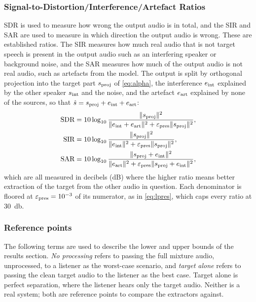 \subsubsection{Signal-to-Distortion/Interference/Artefact Ratios}
\label{sec:sdiar}
SDR is used to measure how wrong the output audio is in total, and the SIR and SAR are used to measure in which direction the output audio is wrong. These are established ratios. The SIR measures how much real audio that is not target speech is present in the output audio such as an interfering speaker or background noise, and the SAR measures how much of the output audio is not real audio, such as artefacts from the model. The output is split by orthogonal projection \cite{vincent2006bsseval} into the target part $s_\textup{proj}$ of \eqref{eq:alpha}, the interference $e_\textup{int}$ explained by the other speaker $s_\textup{int}$ and the noise, and the artefact $e_\textup{art}$ explained by none of the sources, so that $\hat{s} = s_\textup{proj} + e_\textup{int} + e_\textup{art}$:
\begin{equation}
\begin{aligned}
\textup{SDR} &= 10\log_{10} \dfrac{\lVert s_\textup{proj}\rVert^2}{\lVert e_\textup{int} + e_\textup{art}\rVert^2 + \varepsilon_\textup{pres} \lVert s_\textup{proj}\rVert^2}, \\
\textup{SIR} &= 10\log_{10} \dfrac{\lVert s_\textup{proj}\rVert^2}{\lVert e_\textup{int}\rVert^2 + \varepsilon_\textup{pres} \lVert s_\textup{proj}\rVert^2}, \\
\textup{SAR} &= 10\log_{10} \dfrac{\lVert s_\textup{proj} + e_\textup{int}\rVert^2}{\lVert e_\textup{art}\rVert^2 + \varepsilon_\textup{pres} \lVert s_\textup{proj} + e_\textup{int}\rVert^2},
\end{aligned}
\label{eq:sdr-sir-sar}
\end{equation}
which are all measured in decibels (dB) where the higher ratio means better extraction of the target from the other audio in question. Each denominator is floored at $\varepsilon_\textup{pres} = 10^{-3}$ of its numerator, as in \eqref{eq:lpres}, which caps every ratio at \SI[retain-explicit-plus]{+30}{\decibel}. 

\subsubsection{Reference points}                                  
\label{sec:anchors}
The following terms are used to describe the lower and upper bounds of the results section. \emph{No processing} refers to passing the full mixture audio, unprocessed, to a listener as the worst-case scenario, and \emph{target alone} refers to passing the clean target audio to the listener as the best case. Target alone is perfect separation, where the listener hears only the target audio. Neither is a real system; both are reference points to compare the extractors against. 
